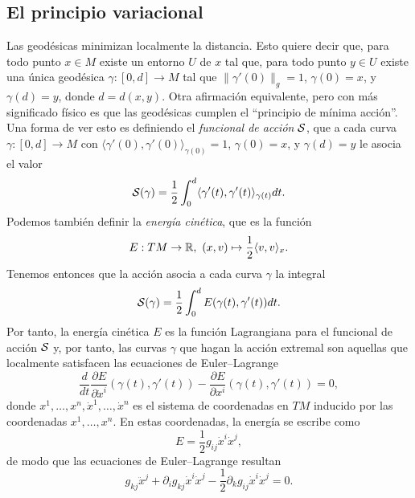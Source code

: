 \documentclass[11pt,a4paper]{amsbook}
\theoremstyle{remark} \newtheorem{rmk}[subsection]{Observación}
\theoremstyle{definition} \newtheorem{defn}[subsection]{Definición}
\theoremstyle{definition} \newtheorem{ex}[subsection]{Ejemplo}
\theoremstyle{definition} \newtheorem{ej}[subsection]{Ejercicio}
\begin{document}
\subsection{El principio variacional} Las geodésicas minimizan localmente la distancia. Esto quiere decir que, para todo punto $x\in M$ existe un entorno $U$ de $x$ tal que, para todo punto $y\in U$ existe una única geodésica $\gamma:[0,d]\rightarrow M$ tal que $\lVert \gamma'(0) \rVert_{g} = 1$, $\gamma(0)=x$, y $\gamma(d)=y$, donde $d=d(x,y)$. Otra afirmación equivalente, pero con más significado físico es que las geodésicas cumplen el ``principio de mínima acción''. Una forma de ver esto es definiendo el \emph{funcional de acción} $\mathcal S$, que a cada curva $\gamma:[0,d]\rightarrow M$ con $\langle \gamma'(0),\gamma'(0) \rangle_{\gamma(0)} = 1$, $\gamma(0)=x$, y $\gamma(d)=y$ le asocia el valor
\begin{equation*}
\mathcal S (\gamma) = \frac{1}{2} \int_{0}^d \langle \gamma'(t),\gamma'(t) \rangle_{\gamma(t)} dt.
\end{equation*}
Podemos también definir la \emph{energía cinética}, que es la función
\begin{equation*}
E: TM \rightarrow \RR, \ (x,v) \mapsto \frac{1}{2} \langle v,v\rangle_x.
\end{equation*}
Tenemos entonces que la acción asocia a cada curva $\gamma$ la integral
\begin{equation*}
\mathcal S(\gamma) = \frac{1}{2} \int_0^d E(\gamma(t),\gamma'(t)) dt.
\end{equation*}
Por tanto, la energía cinética $E$ es la función Lagrangiana para el funcional de acción $\mathcal S$ y, por tanto, las curvas $\gamma$ que hagan la acción extremal son aquellas que localmente satisfacen las ecuaciones de Euler--Lagrange
\begin{equation*}
\frac{d}{dt} \frac{\partial E}{\partial \dot{x}^i} (\gamma(t),\gamma'(t)) -\frac{\partial E}{\partial x^i} (\gamma(t),\gamma'(t))  = 0,
\end{equation*}
donde $x^1,\dots,x^n,\dot{x}^1,\dots,\dot{x}^n$ es el sistema de coordenadas en $TM$ inducido por las coordenadas $x^1,\dots,x^n$. En estas coordenadas, la energía se escribe como
\begin{equation*}
E = \frac{1}{2} g_{ij} \dot{x}^i \dot{x}^j,
\end{equation*}
de modo que las ecuaciones de Euler--Lagrange resultan
\begin{equation*}
g_{kj} \ddot{x}^j + \partial_i g_{kj} \dot{x}^i \dot{x}^j - \frac{1}{2} \partial_k g_{ij} \dot{x}^i \dot{x}^j = 0.
\end{equation*}
\end{document}
